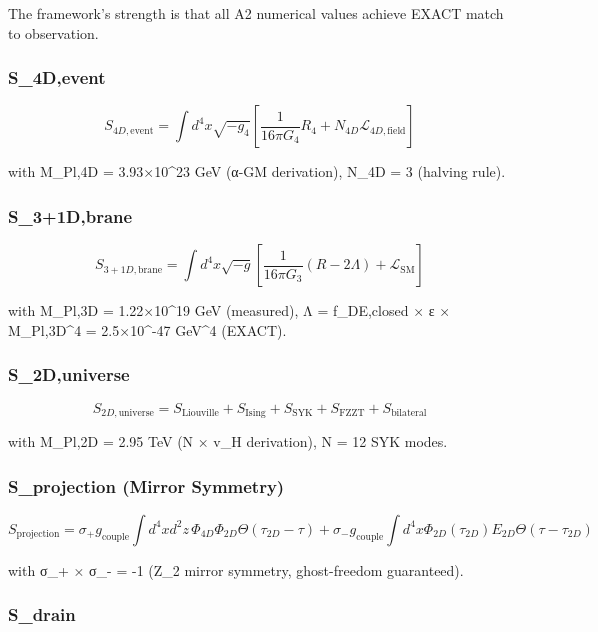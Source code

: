 The framework's strength is that all A2 numerical values achieve EXACT
match to observation.

\hypertarget{s_4devent}{%
\subsubsection{S\_4D,event}\label{s_4devent}}

\[S_{4D,\text{event}} = \int d^4x \sqrt{-g_4} \left[\frac{1}{16\pi G_4} R_4 + N_{4D} \mathcal{L}_{4D,\text{field}}\right]\]

with M\_Pl,4D = 3.93×10\^{}23 GeV (α-GM derivation), N\_4D = 3 (halving
rule).

\hypertarget{s_31dbrane}{%
\subsubsection{S\_3+1D,brane}\label{s_31dbrane}}

\[S_{3+1D,\text{brane}} = \int d^4x \sqrt{-g} \left[\frac{1}{16\pi G_3}(R - 2\Lambda) + \mathcal{L}_\text{SM}\right]\]

with M\_Pl,3D = 1.22×10\^{}19 GeV (measured), Λ = f\_DE,closed × ε ×
M\_Pl,3D\^{}4 = 2.5×10\^{}-47 GeV\^{}4 (EXACT).

\hypertarget{s_2duniverse}{%
\subsubsection{S\_2D,universe}\label{s_2duniverse}}

\[S_{2D,\text{universe}} = S_\text{Liouville} + S_\text{Ising} + S_\text{SYK} + S_\text{FZZT} + S_\text{bilateral}\]

with M\_Pl,2D = 2.95 TeV (N × v\_H derivation), N = 12 SYK modes.

\hypertarget{s_projection-mirror-symmetry}{%
\subsubsection{S\_projection (Mirror
Symmetry)}\label{s_projection-mirror-symmetry}}

\[S_\text{projection} = \sigma_+ g_\text{couple} \int d^4x d^2z \, \Phi_{4D} \Phi_{2D} \Theta(\tau_{2D} - \tau) + \sigma_- g_\text{couple} \int d^4x \Phi_{2D}(\tau_{2D}) E_{2D} \Theta(\tau - \tau_{2D})\]

with σ\_+ × σ\_- = -1 (Z\_2 mirror symmetry, ghost-freedom guaranteed).

\hypertarget{s_drain}{%
\subsubsection{S\_drain}\label{s_drain}}

